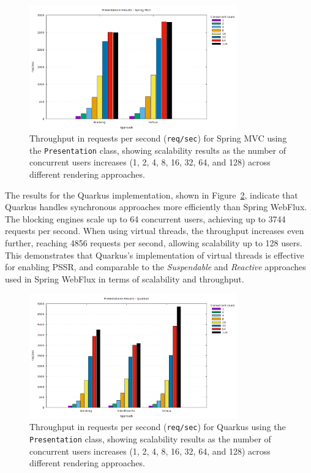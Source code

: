 \documentclass[software,article,accept,pdftex,moreauthors]{Definitions/mdpi}
\begin{document}
\begin{figure}[H]
\vspace{-6pt}
     \includegraphics[width=0.8\textwidth]{./Graphs/presentations-springmvc-jmeter.png}
     \caption{Throughput in requests per second (\texttt{req/sec}) for Spring
MVC using the \texttt{Presentation} class, showing scalability results as
the number of concurrent users increases (1, 2, 4, 8, 16, 32, 64, and 128)
across different rendering approaches.}
\label{fig:presentations-springmvc-jmeter}
\end{figure}



The results for the Quarkus implementation, shown in
Figure~\ref{fig:presentations-quarkus-jmeter}, indicate that Quarkus handles
synchronous approaches more efficiently than Spring WebFlux. The blocking
engines scale up to 64 concurrent users, achieving up to 3744 requests per
second. When using virtual threads, the throughput increases even further,
reaching 4856 requests per second, allowing scalability up to 128 users. This
demonstrates that Quarkus's implementation of virtual threads is effective for
enabling PSSR\@, and comparable to the \textit{Suspendable} and
\textit{Reactive} approaches used in Spring WebFlux in terms of scalability and
throughput.

\vspace{-3pt}
\begin{figure}[H]
     \includegraphics[width=0.8\textwidth]{./Graphs/presentations-quarkus-jmeter.png}
     \caption{Throughput in requests per second (\texttt{req/sec}) for Quarkus
      using the \texttt{Presentation} class, showing scalability results as the
      number of concurrent users increases (1, 2, 4, 8, 16, 32, 64, and 128)
      across different rendering approaches.}
\label{fig:presentations-quarkus-jmeter}
\end{figure}
\end{document}
